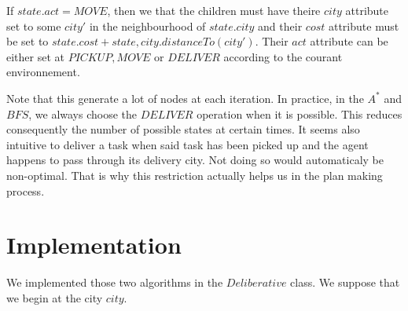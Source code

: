 \documentclass[11pt]{article}
\begin{document}
If $state.act = MOVE$, then we that the children must have theire $city$ attribute set to some $city'$ in the neighbourhood of $state.city$ and their $cost$ attribute must be set to $state.cost+state,city.distanceTo(city')$. Their $act$ attribute can be either set at $PICKUP, MOVE$ or $DELIVER$ according to the courant environnement.	

Note that this generate a lot of nodes at each iteration. In practice, in the $A^*$  and $BFS$, we always choose the $DELIVER$ operation when it is possible. This reduces consequently the number of possible states at certain times. It seems also intuitive to deliver a task when said task has been picked up and the agent happens to pass through its delivery city. Not doing so would automaticaly be non-optimal. That is why this restriction actually helps us in the plan making process.

\section{Implementation}
We implemented those two algorithms in the $Deliberative$ class. We suppose that we begin at the city $city$.
\end{document}
